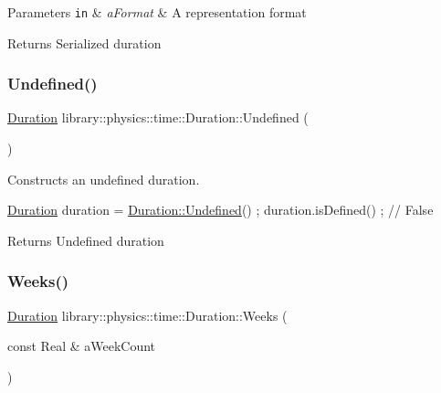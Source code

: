\begin{DoxyParams}[1]{Parameters}
\mbox{\tt in}  & {\em a\+Format} & A representation format \\
\hline
\end{DoxyParams}
\begin{DoxyReturn}{Returns}
Serialized duration 
\end{DoxyReturn}
\mbox{\label{classlibrary_1_1physics_1_1time_1_1_duration_a67012781d9b7491e26bdc3da9f513130}} 
\subsubsection{\texorpdfstring{Undefined()}{Undefined()}}
{\footnotesize\ttfamily \hyperlink{classlibrary_1_1physics_1_1time_1_1_duration}{Duration} library\+::physics\+::time\+::\+Duration\+::\+Undefined (\begin{DoxyParamCaption}{ }\end{DoxyParamCaption})\hspace{0.3cm}{\ttfamily [static]}}



Constructs an undefined duration. 


\begin{DoxyCode}
\hyperlink{classlibrary_1_1physics_1_1time_1_1_duration_a0a70efcf487a841da572afcf00001f64}{Duration} duration = \hyperlink{classlibrary_1_1physics_1_1time_1_1_duration_a67012781d9b7491e26bdc3da9f513130}{Duration::Undefined}() ;
duration.isDefined() ; \textcolor{comment}{// False}
\end{DoxyCode}


\begin{DoxyReturn}{Returns}
Undefined duration 
\end{DoxyReturn}
\mbox{\label{classlibrary_1_1physics_1_1time_1_1_duration_ae9d507f6cbb36902529b28d3721507c1}} 
\subsubsection{\texorpdfstring{Weeks()}{Weeks()}}
{\footnotesize\ttfamily \hyperlink{classlibrary_1_1physics_1_1time_1_1_duration}{Duration} library\+::physics\+::time\+::\+Duration\+::\+Weeks (\begin{DoxyParamCaption}\item[{const Real \&}]{a\+Week\+Count }\end{DoxyParamCaption})\hspace{0.3cm}{\ttfamily [static]}}



